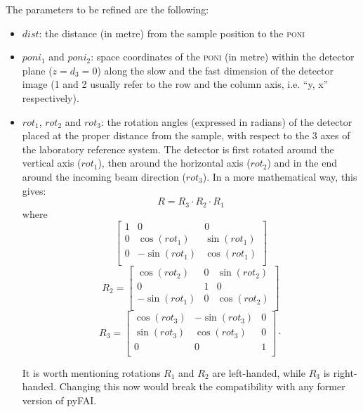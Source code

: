 \documentclass[preprint]{iucr}              %
\begin{document}
The parameters to be refined are the following:
\begin{itemize}
  \item $dist$: the distance (in metre) from the sample position to the
  \textsc{poni}
  \item $poni_1$ and $poni_2$: space coordinates of the
  \textsc{poni} (in metre) within the detector plane ($z=d_3=0$) along the slow
  and the fast dimension of the detector image (1 and 2 usually refer to the row
  and the column axis, i.e. ``y, x'' respectively).
  \item $rot_1$, $rot_2$ and $rot_3$: the
  rotation angles (expressed in radians) of the detector placed at the proper
  distance from the sample, with respect to the 3 axes of the
  laboratory reference system.
  The detector is first rotated around the vertical axis ($rot_1$), then
  around the horizontal axis ($rot_2$) and in the end around the
  incoming beam direction ($rot_3$). In a more mathematical way, this gives:
\begin{equation}
	R = R_3 \cdot R_2 \cdot R_1 
\end{equation}
where
\begin{equation} 	
	\begin{bmatrix}
	1 & 0 & 0\\
	0 & \cos(rot_1) & \sin(rot_1) \\
	0 & -\sin(rot_1) & \cos(rot_1) \\
	\end{bmatrix}
\end{equation}
\begin{equation} 		
	R_2 =
	\begin{bmatrix}
	\cos(rot_2) & 0 & \sin(rot_2) \\
	0 & 1 & 0 \\
	-\sin(rot_1)&0 & \cos(rot_2) \\
	\end{bmatrix}
\end{equation}
\begin{equation} 	
	R_3 =
	\begin{bmatrix}
	\cos(rot_3) & -\sin(rot_3) & 0 \\
	\sin(rot_3) & \cos(rot_3) & 0\\
	0 & 0 & 1\\
	\end{bmatrix}
	\cdot 
\end{equation}

 It is worth mentioning rotations $R_1$ and $R_2$ are left-handed, while 
 $R_3$ is right-handed. Changing this now would break the compatibility with
 any former version of pyFAI.
\end{itemize}
\end{document}
